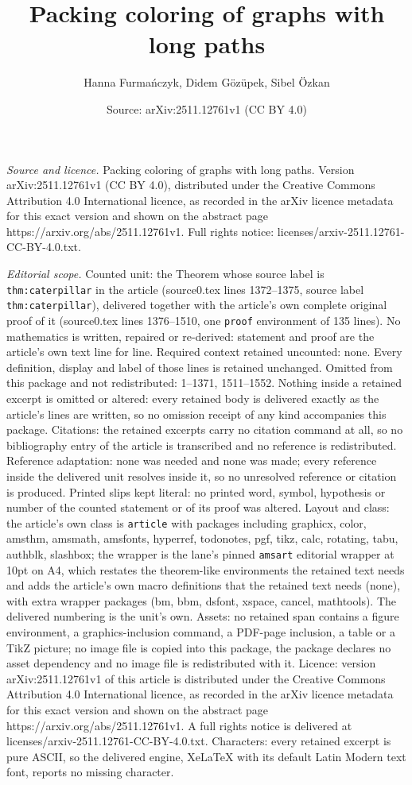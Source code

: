 \documentclass[10pt,a4paper]{amsart}
\title[Packing coloring of graphs with long paths]{Packing coloring of graphs with long paths}
\author{Hanna Furma\'nczyk, Didem G\"oz\"upek, Sibel \"Ozkan}
\date{Source: arXiv:2511.12761v1 (CC BY 4.0)}
\begin{document}
\maketitle

\noindent\emph{Source and licence.} Packing coloring of graphs with long paths. Version arXiv:2511.12761v1 (CC BY 4.0), distributed under the Creative Commons Attribution 4.0 International licence, as recorded in the arXiv licence metadata for this exact version and shown on the abstract page https://arxiv.org/abs/2511.12761v1. Full rights notice: licenses/arxiv-2511.12761-CC-BY-4.0.txt.\par\smallskip

\noindent\textit{Editorial scope.} Counted unit: the Theorem whose source label is \texttt{thm:caterpillar} in the article (source0.tex lines 1372--1375, source label \texttt{thm:caterpillar}), delivered together with the article's own complete original proof of it (source0.tex lines 1376--1510, one \texttt{proof} environment of 135 lines). No mathematics is written, repaired or re-derived: statement and proof are the article's own text line for line. Required context retained uncounted: none. Every definition, display and label of those lines is retained unchanged. Omitted from this package and not redistributed: 1--1371, 1511--1552. Nothing inside a retained excerpt is omitted or altered: every retained body is delivered exactly as the article's lines are written, so no omission receipt of any kind accompanies this package. Citations: the retained excerpts carry no citation command at all, so no bibliography entry of the article is transcribed and no reference is redistributed. Reference adaptation: none was needed and none was made; every reference inside the delivered unit resolves inside it, so no unresolved reference or citation is produced. Printed slips kept literal: no printed word, symbol, hypothesis or number of the counted statement or of its proof was altered. Layout and class: the article's own class is \texttt{article} with packages including graphicx, color, amsthm, amsmath, amsfonts, hyperref, todonotes, pgf, tikz, calc, rotating, tabu, authblk, slashbox; the wrapper is the lane's pinned \texttt{amsart} editorial wrapper at 10pt on A4, which restates the theorem-like environments the retained text needs and adds the article's own macro definitions that the retained text needs (none), with extra wrapper packages (bm, bbm, dsfont, xspace, cancel, mathtools). The delivered numbering is the unit's own. Assets: no retained span contains a figure environment, a graphics-inclusion command, a PDF-page inclusion, a table or a TikZ picture; no image file is copied into this package, the package declares no asset dependency and no image file is redistributed with it. Licence: version arXiv:2511.12761v1 of this article is distributed under the Creative Commons Attribution 4.0 International licence, as recorded in the arXiv licence metadata for this exact version and shown on the abstract page https://arxiv.org/abs/2511.12761v1. A full rights notice is delivered at licenses/arxiv-2511.12761-CC-BY-4.0.txt. Characters: every retained excerpt is pure ASCII, so the delivered engine, XeLaTeX with its default Latin Modern text font, reports no missing character.
\end{document}
